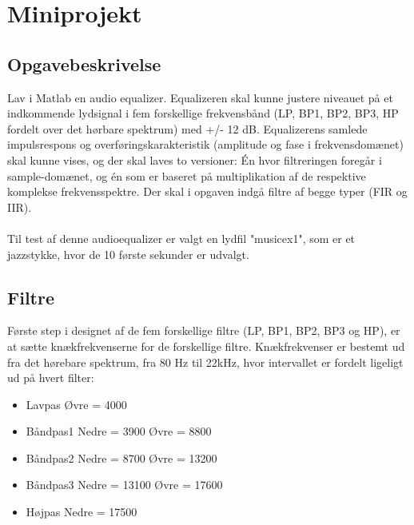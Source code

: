 \chapter{Miniprojekt}
\section{Opgavebeskrivelse}
Lav i Matlab en audio equalizer. Equalizeren skal kunne justere niveauet på et indkommende lydsignal i fem forskellige frekvensbånd (LP, BP1, BP2, BP3, HP fordelt over det hørbare spektrum) med +/- 12 dB. Equalizerens samlede impulsrespons og overføringskarakteristik (amplitude og fase i frekvensdomænet) skal kunne vises, og der skal laves to versioner: Én hvor filtreringen foregår i sample-domænet, og én som er baseret på multiplikation af de respektive komplekse frekvensspektre. Der skal i opgaven indgå filtre af begge typer (FIR og IIR).
\\ \\
Til test af denne audioequalizer er valgt en lydfil "musicex1", som er et jazzstykke, hvor de 10 første sekunder er udvalgt.
\section{Filtre}
Første step i designet af de fem forskellige filtre (LP, BP1, BP2, BP3 og HP), er at sætte knækfrekvenserne for de forskellige filtre. Knækfrekvenser er bestemt ud fra det hørebare spektrum, fra 80 Hz til 22kHz, hvor intervallet er fordelt ligeligt ud på hvert filter:
\begin{itemize}
	\item Lavpas
	\subitem Øvre = 4000
	\item Båndpas1
	\subitem Nedre = 3900
	\subitem Øvre = 8800 
	\item Båndpas2
	\subitem Nedre = 8700
	\subitem Øvre = 13200
	\item Båndpas3
	\subitem Nedre = 13100
	\subitem Øvre = 17600
	\item Højpas
	\subitem Nedre = 17500 
\end{itemize}


